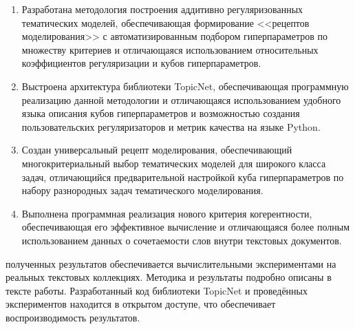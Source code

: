 {} 
\begin{enumerate}[beginpenalty=10000] %
\item  
    Разработана методология построения аддитивно регуляризованных тематических моделей, обеспечивающая формирование <<рецептов моделирования>> с автоматизированным подбором гиперпараметров по множеству критериев и отличающаяся использованием относительных коэффициентов регуляризации и кубов гиперпараметров.  
\item  
    Выстроена архитектура библиотеки TopicNet, обеспечивающая программную реализацию данной методологии и отличающаяся использованием удобного языка описания кубов гиперпараметров и возможностью создания пользовательских регуляризаторов и метрик качества на языке Python. 
\item  
    Создан универсальный рецепт моделирования, обеспечивающий многокритериальный выбор тематических моделей для широкого класса задач, отличающийся предварительной настройкой куба гиперпараметров по набору разнородных задач тематического моделирования.     
\item  
    Выполнена программная реализация нового критерия когерентности, обеспечивающая его эффективное вычисление и отличающаяся более полным использованием данных о сочетаемости слов внутри текстовых документов. 
\end{enumerate} 

{\reliability} полученных результатов обеспечивается вычислительными экспериментами на реальных текстовых коллекциях. Методика и результаты подробно описаны в тексте работы. Разработанный код библиотеки TopicNet и проведённых экспериментов находится в открытом доступе, что обеспечивает воспроизводимость результатов.   


